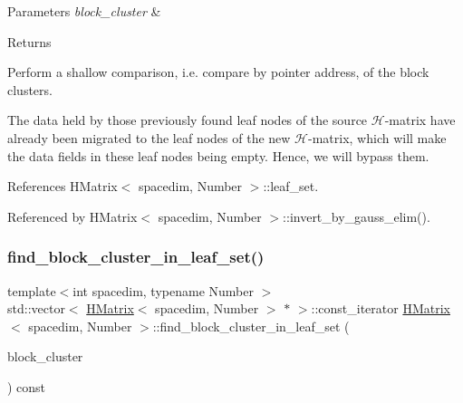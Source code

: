 \begin{DoxyParams}{Parameters}
{\em block\+\_\+cluster} & \\
\hline
\end{DoxyParams}
\begin{DoxyReturn}{Returns}

\end{DoxyReturn}
Perform a shallow comparison, i.\+e. compare by pointer address, of the block clusters.


\begin{DoxyDescription}
\item[Note ]The data held by those previously found leaf nodes of the source $\mathcal{H}$-\/matrix have already been migrated to the leaf nodes of the new $\mathcal{H}$-\/matrix, which will make the data fields in these leaf nodes being empty. Hence, we will bypass them. 
\end{DoxyDescription}

References H\+Matrix$<$ spacedim, Number $>$\+::leaf\+\_\+set.



Referenced by H\+Matrix$<$ spacedim, Number $>$\+::invert\+\_\+by\+\_\+gauss\+\_\+elim().

\mbox{\label{classHMatrix_a723cc200afe31148fcc28f0120c5ec54}} 
\subsubsection{\texorpdfstring{find\+\_\+block\+\_\+cluster\+\_\+in\+\_\+leaf\+\_\+set()}{find\_block\_cluster\_in\_leaf\_set()}\hspace{0.1cm}{\footnotesize\ttfamily [2/2]}}
{\footnotesize\ttfamily template$<$int spacedim, typename Number $>$ \\
std\+::vector$<$ \hyperlink{classHMatrix}{H\+Matrix}$<$ spacedim, Number $>$ $\ast$ $>$\+::const\+\_\+iterator \hyperlink{classHMatrix}{H\+Matrix}$<$ spacedim, Number $>$\+::find\+\_\+block\+\_\+cluster\+\_\+in\+\_\+leaf\+\_\+set (\begin{DoxyParamCaption}\item[{const \hyperlink{classBlockCluster}{Block\+Cluster}$<$ spacedim, Number $>$ \&}]{block\+\_\+cluster }\end{DoxyParamCaption}) const}

